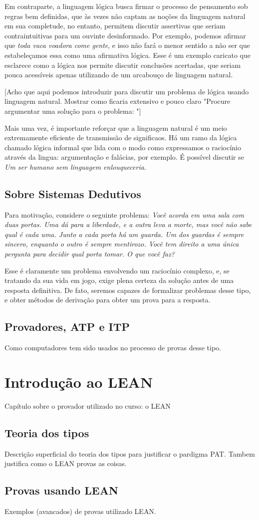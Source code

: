 Em contraparte, a linguagem lógica busca firmar o processo de pensamento sob regras bem definidas, que às vezes não captam as noções da linguagem natural em sua completude, no entanto, permitem discutir assertivas que seriam contraintuitivas para um ouvinte desinformado. Por exemplo, podemos afirmar que \textit{toda vaca voadora come gente}, e isso não fará o menor sentido a não ser que estabeleçamos essa como uma afirmativa lógica. Esse é um exemplo caricato que esclarece como a lógica nos permite discutir conclusões acertadas, que seriam pouca acessíveis apenas utilizando de um arcabouço de linguagem natural.

[Acho que aqui podemos introduzir para discutir um problema de lógica usando linguagem natural. Mostrar como ficaria extensivo e pouco claro "Procure argumentar uma solução para o problema: "]

Mais uma vez, é importante reforçar que a linguagem natural é um meio extremamente eficiente de transmissão de significaos. Há um ramo da lógica chamado lógica informal que lida com o modo como expressamos o raciocínio através da lingua: argumentação e falácias, por exemplo. É possível discutir se \textit{Um ser humano sem linguagem enlouqueceria}.

\section{Sobre Sistemas Dedutivos}
Para motivação, considere o seguinte problema: \textit{Você acorda em uma sala com duas portas. Uma dá para a liberdade, e a outra leva a morte, mas você não sabe qual é cada uma. Junto a cada porta há um guarda. Um dos guardas é sempre sincero, enquanto o outro é sempre mentirozo. Você tem direito a uma única pergunta para decidir qual porta tomar. O que você faz?}

Esse é claramente um problema envolvendo um raciocínio complexo, e, se tratando da sua vida em jogo, exige plena certeza da solução antes de uma resposta definitiva. De fato, seremos capazes de formalizar problemas desse tipo, e obter métodos de derivação para obter um prova para a resposta.

\section{Provadores, ATP e ITP}
Como computadores tem sido usados no processo de provas desse tipo.

\chapter{Introdução ao LEAN}
Capítulo sobre o provador utilizado no curso: o LEAN

\section{Teoria dos tipos}
Descrição superficial do teoria dos tipos para justificar o pardigma PAT.
Tambem justifica como o LEAN provas as coisas.

\section{Provas usando LEAN}
Exemplos (avancados) de provas utilizado LEAN.
